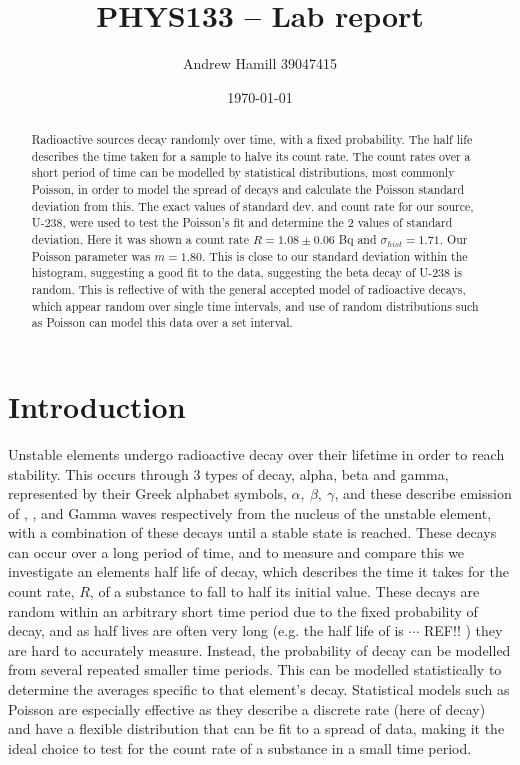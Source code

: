 \documentclass[11pt]{article}
\begin{document}
    \title{PHYS133 -- Lab report}
    \author{Andrew Hamill 39047415}
    \date{\today}
    \maketitle

    \begin{abstract}
    Radioactive sources decay randomly over time, with a fixed probability. The half life describes the time taken for a sample to halve its count rate. The count rates over a short period of time can be modelled by statistical distributions, most commonly Poisson, in order to model the spread of decays and calculate the Poisson standard deviation from this. The exact values of standard dev. and count rate for our source, U-238, were used to test the Poisson's fit and determine the 2 values of standard deviation. Here it was shown a count rate $ R = 1.08 \pm 0.06$ Bq and $\sigma_{hist} = 1.71$. Our Poisson parameter was $m = 1.80$. This is close to our standard deviation within the histogram, suggesting a good fit to the data, suggesting the beta decay of U-238 is random. This is reflective of with the general accepted model of radioactive decays, which appear random over single time intervals, and use of random distributions such as Poisson can model this data over a set interval. 
    \end{abstract}

    \section{Introduction}
    Unstable elements undergo radioactive decay over their lifetime in order to reach stability. This occurs through 3 types of decay, alpha, beta and gamma, represented by their Greek alphabet symbols, $\alpha,\  \beta,\ \gamma$, and these describe emission of , , and Gamma waves respectively from the nucleus of the unstable element, with a combination of these decays until a stable state is reached. These decays can occur over a long period of time, and to measure and compare this we investigate an elements half life of decay, which describes the time it takes for the count rate, $R$, of a substance to fall to half its initial value.
    These decays are random within an arbitrary short time period due to the fixed probability of decay, and as half lives are often very long (e.g. the half life of  is $\cdots$ REF!! ) they are hard to accurately measure. Instead, the probability of decay can be modelled from several repeated smaller time periods. This can be modelled statistically to determine the averages specific to that element's decay. Statistical models such as Poisson are especially effective as they describe a discrete rate (here of decay) and have a flexible distribution that can be fit to a spread of data, making it the ideal choice to test for the count rate of a substance in a small time period. 
    
\end{document}
